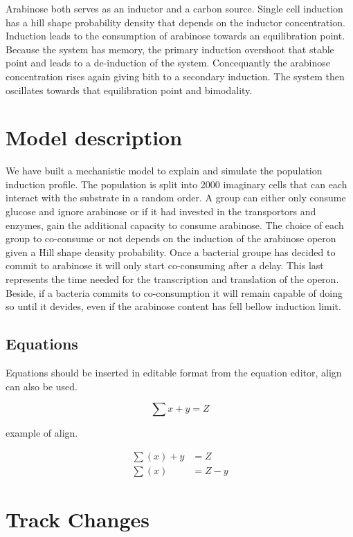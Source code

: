 \documentclass[utf8]{ReportTERRA}
\begin{document}
Arabinose both serves as an inductor and a carbon source. Single cell induction has a hill shape probability density that depends on the inductor concentration. Induction leads to the consumption of arabinose towards an equilibration point. Because the system has memory, the primary induction overshoot that stable point and leads to a de-induction of the system. Concequantly the arabinose concentration rises again giving bith to a secondary induction. The system then oscillates towards that equilibration point and bimodality.

\section{Model description}

We have built a mechanistic model to explain and simulate the population induction profile. The population is split into 2000 imaginary cells that can each interact with the substrate in a random order. A group can either  only consume glucose and ignore arabinose or if it had invested in the transportors and enzymes, gain the additional capacity to consume arabinose. The choice of each group to co-consume or not depends on the induction of the arabinose operon given a Hill shape density probability. Once a bacterial groupe has decided to commit to arabinose it will only start co-consuming after a delay. This last represents the time needed for the transcription and translation of the operon. Beside, if a bacteria commits to co-consumption it will remain capable of doing so until it devides, even if the arabinose content has fell bellow induction limit.

\subsection{Equations}
Equations should be inserted in editable format from the equation editor, align can also be used.

\begin{equation}
\sum x+ y =Z\label{eq:01}
\end{equation}

example of align.

\begin{align}
\sum (x) + y &= Z\label{eq:02}\\
\sum (x) &= Z - y\label{eq:03}
\end{align}




\section{Track Changes}
\end{document}

